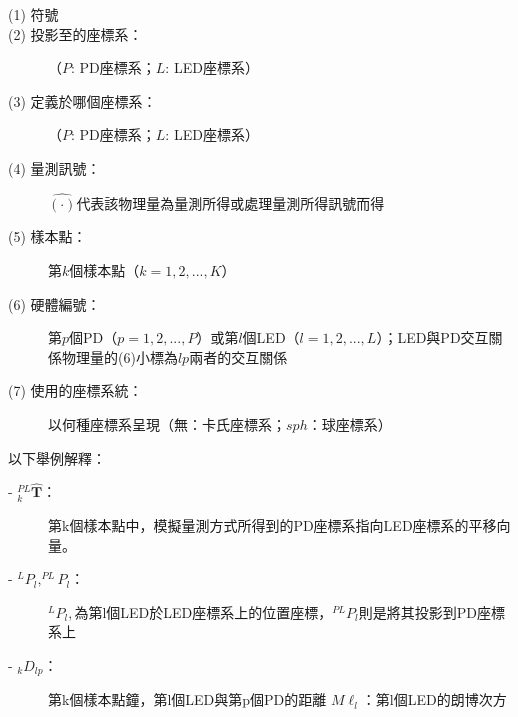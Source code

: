 \begin{description}
    \item[(1) 符號] 
    \item[(2) 投影至的座標系：] （$P$: PD座標系；$L$: LED座標系）
    \item[(3) 定義於哪個座標系：] （$P$: PD座標系；$L$: LED座標系）
    \item[(4) 量測訊號：] $\hat{(\cdot)}$代表該物理量為量測所得或處理量測所得訊號而得
    \item[(5) 樣本點：] 第$k$個樣本點（$k=1,2,...,K$）
    \item[(6) 硬體編號：] 第$p$個PD（$p=1,2,...,P$）或第$l$個LED（$l=1,2,...,L$）；LED與PD交互關係物理量的(6)小標為$lp$兩者的交互關係
    \item[(7) 使用的座標系統：]  以何種座標系呈現（無：卡氏座標系；$sph$：球座標系）
\end{description}


以下舉例解釋：
\begin{description}
\item[- $^{PL}_{k}\hat{\boldsymbol{T}}$：]第k個樣本點中，模擬量測方式所得到的PD座標系指向LED座標系的平移向量。

\item[- $^{L}P_l,^{PL}P_l$：]$^{L}P_l,$為第l個LED於LED座標系上的位置座標，$^{PL}P_l$則是將其投影到PD座標系上

\item[- $_{k}D_{l p}$：]第k個樣本點鐘，第l個LED與第p個PD的距離
$M\ell_l$：第l個LED的朗博次方
\end{description}